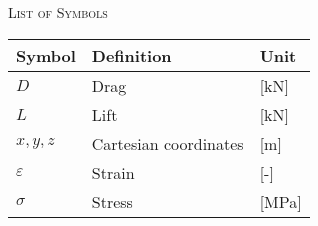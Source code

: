 \documentclass[a4paper, twoside, 12pt]{report}
\begin{document}
\pagestyle{plain}




\vspace*{-0.5cm}
\renewcommand{\baselinestretch}{1.40}\normalsize
\renewcommand{\cfttoctitlefont}{\huge\scshape}
\renewcommand{\contentsname}{\hfill Table of Contents \hfill}
\renewcommand{\cftaftertoctitle}{\hfill}
\tableofcontents
\renewcommand{\baselinestretch}{1.0}\normalsize

\newpage
{}
{}
\renewcommand{\baselinestretch}{1.7}\normalsize
\renewcommand{\cftloftitlefont}{\hfill\huge\scshape}
\renewcommand{\listfigurename}{List of Figures}
\renewcommand{\cftafterloftitle}{\hfill}
\listoffigures
\renewcommand{\baselinestretch}{1.0}\normalsize

\vfill
{}
{}
\renewcommand{\baselinestretch}{1.7}\normalsize
\renewcommand{\cftlottitlefont}{\hfill\huge\scshape}
\renewcommand{\listtablename}{List of Tables}
\renewcommand{\cftafterlottitle}{\hfill}
\listoftables
\renewcommand{\baselinestretch}{1.0}\normalsize
\vfill

\newpage
\parbox{\textwidth}{\centering\scshape\huge List of Symbols \par}
\vspace{1cm}
\begin{table}[h!]
\centering
\begin{tabular}{lll}
\textbf{Symbol} & \textbf{Definition} & \textbf{Unit} \\ \hline
$D$				& Drag & [kN] \\
$L$				& Lift & [kN] \\
$x,y,z$			& Cartesian coordinates & [m] \\
$\varepsilon$	& Strain & [-] \\
$\sigma$		& Stress & [MPa] \\

\end{tabular}
\end{table}

\newpage
{}
\cleardoublepage
{}
\pagestyle{fancy}
\end{document}
